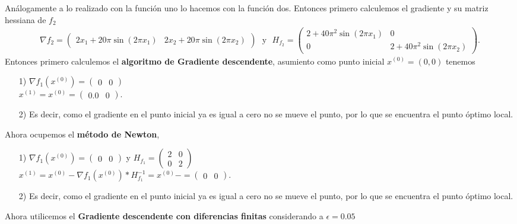 \documentclass[11pt,letterpaper]{article}
\begin{document}
\begin{enumerate}
Análogamente a lo realizado con la función uno lo hacemos con la función dos. Entonces primero calculemos el gradiente y su matriz hessiana de $f_2$
\begin{align*}
\nabla f_2 =\begin{pmatrix} 2x_1+20\pi \sin(2\pi x_1) &
2x_2+20\pi \sin(2\pi x_2) \end{pmatrix} \ \ \ \text{y}\ \ \ H_{f_2}=\begin{pmatrix}
2+40\pi^2 \sin(2\pi x_1) & 0\\
0 & 2+40\pi^2 \sin(2\pi x_2)
\end{pmatrix}.
\end{align*}
Entonces primero calculemos el \textbf{algoritmo de Gradiente descendente}, asumiento como punto inicial $x^{(0)}=(0,0)$ tenemos 
\begin{enumerate}
\item[1)] $\nabla f_1(x^{(0)})=\begin{pmatrix}
0 & 0
\end{pmatrix}$\\
$x^{(1)}=x^{(0)}=\begin{pmatrix}
0.0 & 0
\end{pmatrix}. $
\item[2)] Es decir, como el gradiente en el punto inicial ya es igual a cero no se mueve el punto, por lo que se encuentra el punto óptimo local.
\end{enumerate}
Ahora ocupemos el \textbf{método de Newton},
\begin{enumerate}
\item[1)] $\nabla f_1(x^{(0)})=\begin{pmatrix}
0 & 0
\end{pmatrix}$ y $H_{f_1}=\begin{pmatrix}
2 & 0 \\0 & 2
\end{pmatrix}$\\
$x^{(1)}=x^{(0)}-\nabla f_1(x^{(0)})*H_{f_1}^{-1} =x^{(0)}-=\begin{pmatrix}
0 & 0
\end{pmatrix}. $
\item[2)] Es decir, como el gradiente en el punto inicial ya es igual a cero no se mueve el punto, por lo que se encuentra el punto óptimo local.
\end{enumerate}
Ahora utilicemos el \textbf{Gradiente descendente con diferencias finitas } considerando a $\epsilon=0.05$
\end{enumerate}
\end{document}
